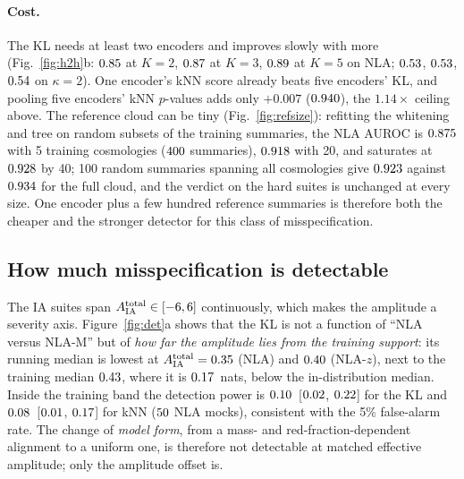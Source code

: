 \documentclass[9pt,twocolumn]{extarticle}
\newcommand{\Aia}{A_{\rm IA}^{\rm total}}
\begin{document}
\paragraph{Cost.} The KL needs at least two encoders and improves slowly with more
(Fig.~\ref{fig:h2h}b: $0.85$ at $K=2$, $0.87$ at $K=3$, $0.89$ at
$K=5$ on NLA; $0.53$, $0.53$, $0.54$ on $\kappa=2$). One encoder's kNN score already beats five encoders' KL, and pooling five encoders' kNN
$p$-values adds only $+0.007$ ($0.940$), the $1.14\times$ ceiling above. The reference
cloud can be tiny (Fig.~\ref{fig:refsize}): refitting the whitening and tree on random subsets of the
training summaries, the NLA AUROC is $0.875$ with 5 training cosmologies
($400$ summaries), $0.918$ with 20, and saturates at
$0.928$ by 40; 100 random summaries spanning all cosmologies give
$0.923$ against $0.934$ for the full cloud, and the verdict
on the hard suites is unchanged at every size. One encoder plus a few hundred reference summaries is
therefore both the cheaper and the stronger detector for this class of misspecification.





\subsection{How much misspecification is detectable}\label{sec:threshold}
The IA suites span $\Aia\in[-6,6]$ continuously, which makes the amplitude a severity axis.
Figure~\ref{fig:det}a shows that the KL is not a function of ``NLA versus NLA-M'' but of \emph{how far
the amplitude lies from the training support}: its running median is lowest at $\Aia=\NNlaKlArgminA$
(NLA) and $0.40$ (NLA-$z$), next to the training median $0.43$, where it is
$0.17$~nats, below the in-distribution median. Inside the training band the detection
power is $0.10$~[$0.02$, $0.22$] for the KL and
$0.08$~[$0.01$, $0.17$] for kNN ($50$ NLA
mocks), consistent with the 5\% false-alarm rate. The change of \emph{model form}, from a mass- and
red-fraction-dependent alignment to a uniform one, is therefore not detectable at matched effective
amplitude; only the amplitude offset is.
\end{document}
